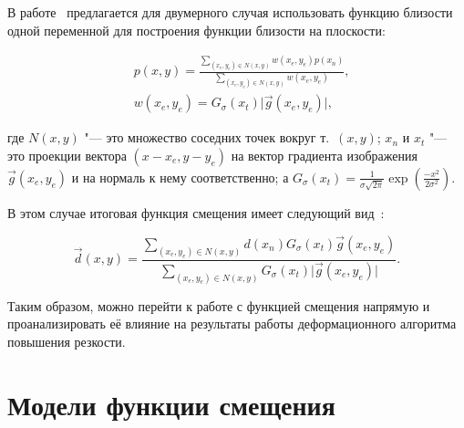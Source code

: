 В работе~\cite{gusev2016parallel} предлагается для двумерного случая использовать функцию близости одной переменной для построения функции близости на плоскости:

\begin{align*}
	&p\left(x,y\right) = \frac{\sum_{\left(x_e,y_e\right) \in N\left(x,y\right)}{w\left(x_e,y_e\right)p\left(x_n\right)}} {\sum_{\left(x_e,y_e\right) \in N\left(x,y\right)}{w\left(x_e,y_e\right)}}, \\
	&w\left(x_e,y_e\right) = G_{\sigma}\left(x_t\right)\lvert \vec{g}\left(x_e,y_e\right) \rvert,
\end{align*}

\noindent где $N\left(x,y\right)$ "--- это множество соседних точек вокруг т.~$\left(x, y\right)$; $x_n$ и $x_t$ "--- это проекции вектора $\left(x-x_e, y-y_e\right)$ на вектор градиента изображения $\vec{g}\left(x_e,y_e\right)$ и на нормаль к нему соответственно; а $G_{\sigma}\left(x_t\right) = \frac{1}{\sigma \sqrt{2\pi}} \exp\left(\frac{-x^2}{2\sigma^2}\right)$.

В этом случае итоговая функция смещения имеет следующий вид~\cite{gusev2016parallel}:

\begin{equation*}
	\vec{d}\left(x,y\right) = \frac{\sum_{\left(x_e,y_e\right) \in N\left(x,y\right)}{d\left(x_n\right) G_{\sigma}\left(x_t\right) \vec{g}\left(x_e,y_e\right) }} {\sum_{\left(x_e,y_e\right) \in N\left(x,y\right)}{G_{\sigma}\left(x_t\right)\lvert \vec{g}\left(x_e,y_e\right) \rvert}}.
\end{equation*}

Таким образом, можно перейти к работе с функцией смещения напрямую и проанализировать её влияние на результаты работы деформационного алгоритма повышения резкости.

\section{Модели функции смещения}

